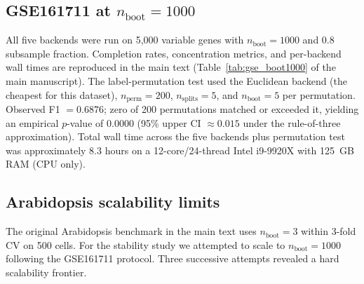 \documentclass[11pt]{article}
\begin{document}
\subsection{GSE161711 at $n_{\text{boot}} = 1000$}

All five backends were run on 5{,}000 variable genes with $n_{\text{boot}} = 1000$ and 0.8 subsample fraction.
Completion rates, concentration metrics, and per-backend wall times are reproduced in the main text (Table~\ref{tab:gse_boot1000} of the main manuscript).
The label-permutation test used the Euclidean backend (the cheapest for this dataset), $n_{\text{perm}} = 200$, $n_{\text{splits}} = 5$, and $n_{\text{boot}} = 5$ per permutation.
Observed F1 $= 0.6876$; zero of 200 permutations matched or exceeded it, yielding an empirical $p$-value of $0.0000$ (95\% upper CI $\approx 0.015$ under the rule-of-three approximation).
Total wall time across the five backends plus permutation test was approximately 8.3 hours on a 12-core/24-thread Intel i9-9920X with 125~GB RAM (CPU only).

\subsection{Arabidopsis scalability limits}

The original Arabidopsis benchmark in the main text uses $n_{\text{boot}} = 3$ within 3-fold CV on 500 cells.
For the stability study we attempted to scale to $n_{\text{boot}} = 1000$ following the GSE161711 protocol.
Three successive attempts revealed a hard scalability frontier.
\end{document}
